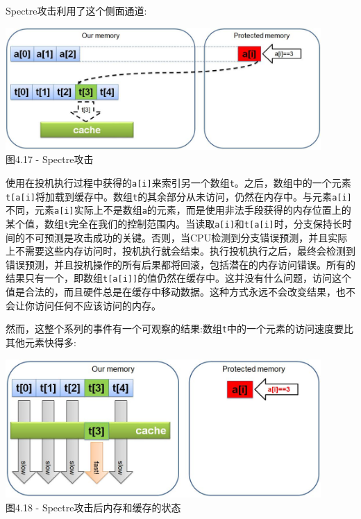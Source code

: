 Spectre攻击利用了这个侧面通道:

\begin{center}
\includegraphics[width=0.9\textwidth]{content/1/chapter4/images/17.jpg}\\
图4.17 - Spectre攻击
\end{center}

使用在投机执行过程中获得的\texttt{a[i]}来索引另一个数组\texttt{t}。之后，数组中的一个元素\texttt{t[a[i]}将加载到缓存中。数组\texttt{t}的其余部分从未访问，仍然在内存中。与元素\texttt{a[i]}不同，元素\texttt{a[i]}实际上不是数组\texttt{a}的元素，而是使用非法手段获得的内存位置上的某个值，数组\texttt{t}完全在我们的控制范围内。当读取\texttt{a[i]}和\texttt{t[a[i]}时，分支保持长时间的不可预测是攻击成功的关键。否则，当CPU检测到分支错误预测，并且实际上不需要这些内存访问时，投机执行就会结束。执行投机执行之后，最终会检测到错误预测，并且投机操作的所有后果都将回滚，包括潜在的内存访问错误。所有的结果只有一个，即数组\texttt{t[a[i]]}的值仍然在缓存中。这并没有什么问题，访问这个值是合法的，而且硬件总是在缓存中移动数据。这种方式永远不会改变结果，也不会让你访问任何不应该访问的内存。

然而，这整个系列的事件有一个可观察的结果:数组\texttt{t}中的一个元素的访问速度要比其他元素快得多:

\begin{center}
\includegraphics[width=0.9\textwidth]{content/1/chapter4/images/18.jpg}\\
图4.18 - Spectre攻击后内存和缓存的状态
\end{center}

